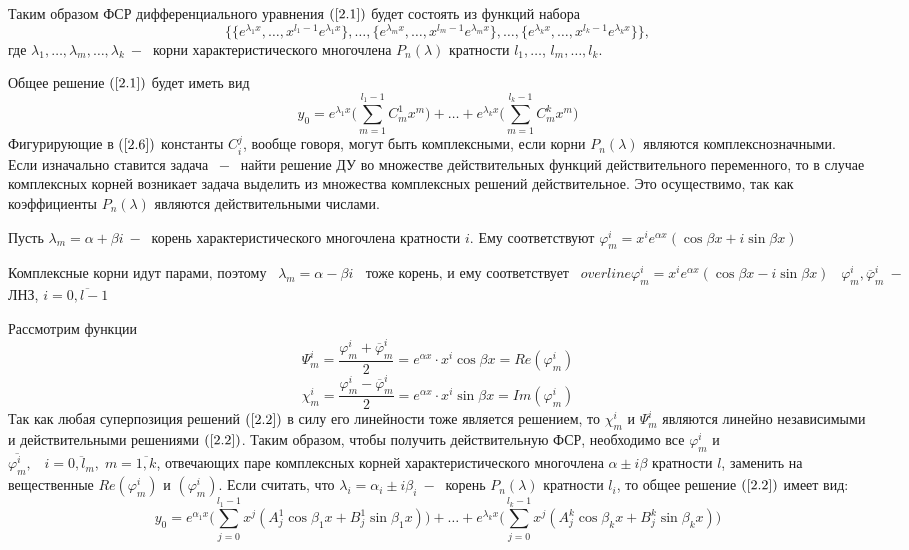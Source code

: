 Таким образом ФСР дифференциального уравнения $(\ref{2.1})$ будет состоять из функций набора
$$ \Bigg\{\{e^{\lambda_1 x}, \dots , x^{l_1-1}e^{\lambda_1 x}\}, \dots, \{e^{\lambda_mx}, \dots, x^{l_m-1 }e^{\lambda_mx}\}, \dots, \{e^{\lambda_k x}, \dots, x^{l_k-1}e^{\lambda_k x}\}\Bigg\},$$
где $\lambda_1, \dots, \lambda_m, \dots, \lambda_k~-~$ корни характеристического многочлена $P_n(\lambda)$ кратности $l_1, \dots$, $l_m, \dots, l_k$.\par
Общее решение $(\ref{2.1})$ будет иметь вид
\begin{equation}
    \tag{2.6}
    \label{2.6}
    y_0=e^{\lambda_1x}\Big(\displaystyle\sum_{m=1}^{l_1-1}C_m^1x^m\Big)+\dots+e^{\lambda_kx}\Big(\displaystyle\sum_{m=1}^{l_k-1}C_m^kx^m\Big)
\end{equation}
Фигурирующие в $(\ref{2.6})$ константы $C_i^j$, вообще говоря, могут быть комплексными, если корни $P_n(\lambda)$ являются комплекснозначными. Если изначально ставится задача $~-~$ найти решение ДУ во множестве действительных функций действительного переменного, то в случае комплексных корней возникает задача выделить из множества комплексных решений действительное. Это осуществимо, так как коэффициенты $P_n(\lambda)$ являются действительными числами.\par
Пусть $\lambda_m=\alpha+\beta i ~-~$ корень характеристического многочлена кратности $i$. Ему соответствуют $\varphi_m^i=x^ie^{\alpha x}(\cos{\beta x}+i\sin{\beta x}) $
\par
$\text{Комплексные корни идут парами, поэтому}\;\;\;\lambda_m=\alpha-\beta i\;\;\text{ тоже корень, и ему соответствует}\;\;\; overline{\varphi}_m^i=x^ie^{\alpha x}(\cos{\beta x}-i\sin{\beta x})\;\;\;\varphi^i_m, \overline{\varphi}_m^i~-~$ ЛНЗ, $i=\overline{0, l-1}$\par
Рассмотрим функции $$\Psi_m^i =\frac{\varphi_m^i+\overline{\varphi}_m^i}{2}=e^{\alpha x}\cdot x^i\cos{\beta x}= Re(\varphi^i_m)$$
$$\chi_m^i =\frac{\varphi_m^i-\overline{\varphi}_m^i}{2}=e^{\alpha x}\cdot x^i\sin{\beta x}= Im(\varphi^i_m)$$
Так как любая суперпозиция решений $(\ref{2.2})$ в силу его линейности тоже является решением, то $\chi_m^i$ и $\Psi_m^i$ являются линейно независимыми и действительными решениями $(\ref{2.2})$. Таким образом, чтобы получить действительную ФСР, необходимо все $\varphi_m^i$ и $\overline{\varphi_m^i}, \;\;\; i=\overline{0, l_m}, \; m=\overline{1, k} $, отвечающих паре комплексных корней характеристического многочлена $\alpha \pm i\beta $ кратности $l$, заменить на вещественные $Re(\varphi_m^i)$ и $(\varphi_m^i)$. Если считать, что $\lambda_i=\alpha_i\pm i\beta_i~-~$ корень $P_n(\lambda)$ кратности $l_i$, то общее решение $(\ref{2.2})$ имеет вид:
\begin{equation}
    \tag{2.7}
    \label{2.7}
    y_0=e^{\alpha_1x}\Big(\displaystyle\sum_{j=0}^{l_1-1}x^j(A^1_j\cos{\beta_1x}+B^1_j\sin{\beta_1x})\Big)+\dots +e^{\lambda_kx}\Big(\displaystyle\sum_{j=0}^{l_k-1}x^j(A_j^k\cos{\beta_kx}+B_j^k\sin{\beta_kx})\Big)
\end{equation}
